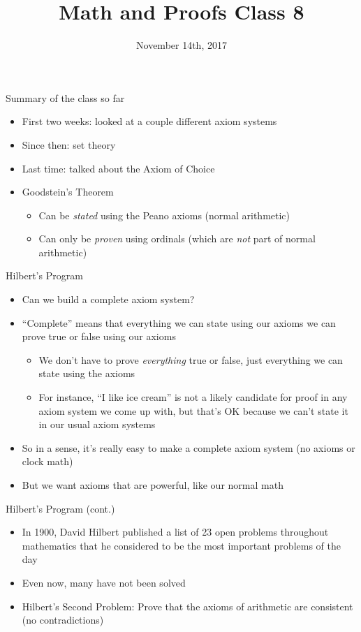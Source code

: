\documentclass{beamer}
\begin{document}
\title[Math and Proofs]{Math and Proofs Class 8}
\date{November 14th, 2017}

\begin{frame}[plain]
\titlepage
\end{frame}

\begin{frame}{Summary of the class so far}
\begin{itemize}
\item First two weeks: looked at a couple different axiom systems
\item Since then: set theory
\item Last time: talked about the Axiom of Choice
\item Goodstein's Theorem
\begin{itemize}
\item Can be \textit{stated} using the Peano axioms (normal arithmetic)
\item Can only be \textit{proven} using ordinals (which are \textit{not} part of normal arithmetic)
\end{itemize}
\end{itemize}
\end{frame}

\begin{frame}{Hilbert's Program}
\begin{itemize}
\item Can we build a complete axiom system?
\item ``Complete'' means that everything we can state using our axioms we can prove true or false using our axioms
\begin{itemize}
\item We don't have to prove \textit{everything} true or false, just everything we can state using the axioms
\item For instance, ``I like ice cream'' is not a likely candidate for proof in any axiom system we come up with, but that's OK because we can't state it in our usual axiom systems
\end{itemize}
\item So in a sense, it's really easy to make a complete axiom system (no axioms or clock math)
\item But we want axioms that are powerful, like our normal math
\end{itemize}
\end{frame}

\begin{frame}{Hilbert's Program (cont.)}
\begin{itemize}
\item In 1900, David Hilbert published a list of 23 open problems throughout mathematics that he considered to be the most important problems of the day
\item Even now, many have not been solved
\item Hilbert's Second Problem: Prove that the axioms of arithmetic are consistent (no contradictions)
\end{itemize}
\end{frame}
\end{document}
